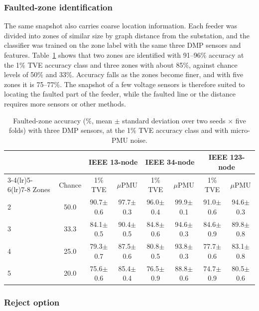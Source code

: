 \documentclass[11pt]{article}
\newenvironment{nw}{}{}
\newcommand{\hlnew}[1]{#1}
\begin{document}
\subsubsection{Faulted-zone identification}\label{subsec5_zone}

\begin{nw}
The same snapshot also carries coarse location information. Each feeder was divided into zones of similar size by graph distance from the substation, and the classifier was trained on the zone label with the same three DMP sensors and features. Table~\ref{tab_zone} shows that two zones are identified with 91--96\% accuracy at the 1\% TVE accuracy class and three zones with about 85\%, against chance levels of 50\% and 33\%. Accuracy falls as the zones become finer, and with five zones it is 75--77\%. The snapshot of a few voltage sensors is therefore suited to locating the faulted part of the feeder, while the faulted line or the distance requires more sensors or other methods.
\end{nw}

\begin{table}[!htbp]
\centering
\caption{\hlnew{Faulted-zone accuracy (\%, mean $\pm$ standard deviation over two seeds $\times$ five folds) with three DMP sensors, at the 1\% TVE accuracy class and with micro-PMU noise.}}\label{tab_zone}
\small
\setlength{\tabcolsep}{3pt}
\begin{tabular}{lccccccc}
\toprule
 & & \multicolumn{2}{c}{IEEE 13-node} & \multicolumn{2}{c}{IEEE 34-node} & \multicolumn{2}{c}{IEEE 123-node}\\
\cmidrule(lr){3-4}\cmidrule(lr){5-6}\cmidrule(lr){7-8}
Zones & Chance & 1\% TVE & $\mu$PMU & 1\% TVE & $\mu$PMU & 1\% TVE & $\mu$PMU\\
\midrule
2 & 50.0 & 90.7$\pm$0.6 & 97.7$\pm$0.3 & 96.0$\pm$0.4 & 99.9$\pm$0.1 & 91.0$\pm$0.6 & 94.6$\pm$0.3\\
3 & 33.3 & 84.1$\pm$0.5 & 90.4$\pm$0.5 & 84.8$\pm$0.6 & 94.6$\pm$0.3 & 84.6$\pm$0.9 & 89.8$\pm$0.8\\
4 & 25.0 & 79.3$\pm$0.7 & 87.5$\pm$0.6 & 80.8$\pm$0.5 & 93.8$\pm$0.3 & 77.7$\pm$0.6 & 83.1$\pm$0.8\\
5 & 20.0 & 75.6$\pm$0.6 & 85.4$\pm$0.4 & 76.5$\pm$0.9 & 88.8$\pm$0.6 & 74.7$\pm$0.9 & 80.5$\pm$0.6\\
\bottomrule
\end{tabular}
\end{table}

\subsubsection{Reject option}\label{subsec5_reject}
\end{document}
